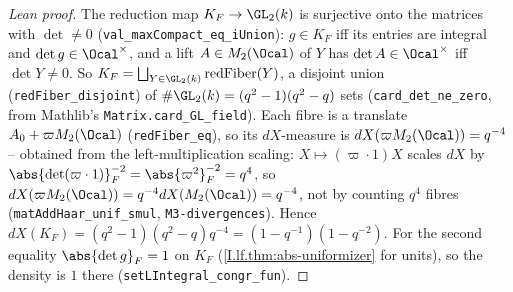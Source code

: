 \begin{proof}[Lean proof]
The reduction map $K_F\to\GL_2(k)$ is surjective onto the matrices with $\det\ne0$ (\texttt{val\_maxCompact\_eq\_iUnion}): $g\in K_F$ iff its entries are integral and $\det g\in\Ocal^\times$, and a lift $A\in M_2(\Ocal)$ of $Y$ has $\det A\in\Ocal^\times$ iff $\det Y\ne0$. So $K_F=\bigsqcup_{Y\in\GL_2(k)}\mathrm{redFiber}(Y)$, a disjoint union (\texttt{redFiber\_disjoint}) of $\#\GL_2(k)=(q^2-1)(q^2-q)$ sets (\texttt{card\_det\_ne\_zero}, from Mathlib's \texttt{Matrix.card\_GL\_field}). Each fibre is a translate $A_0+\varpi M_2(\Ocal)$ (\texttt{redFiber\_eq}), so its $dX$-measure is $dX(\varpi M_2(\Ocal))=q^{-4}$ -- obtained from the left-multiplication scaling: $X\mapsto(\varpi\cdot1)X$ scales $dX$ by $\abs{\det(\varpi\cdot1)}_F^{-2}=\abs{\varpi^2}_F^{-2}=q^{4}$, so $dX(\varpi M_2(\Ocal))=q^{-4}dX(M_2(\Ocal))=q^{-4}$, not by counting $q^4$ fibres (\texttt{matAddHaar\_unif\_smul}, \texttt{M3-divergences}). Hence $dX(K_F)=(q^2-1)(q^2-q)q^{-4}=(1-q^{-1})(1-q^{-2})$. For the second equality $\abs{\det g}_F=1$ on $K_F$ (\cref{I.lf.thm:abs-uniformizer} for units), so the density is $1$ there (\texttt{setLIntegral\_congr\_fun}).
\end{proof}

